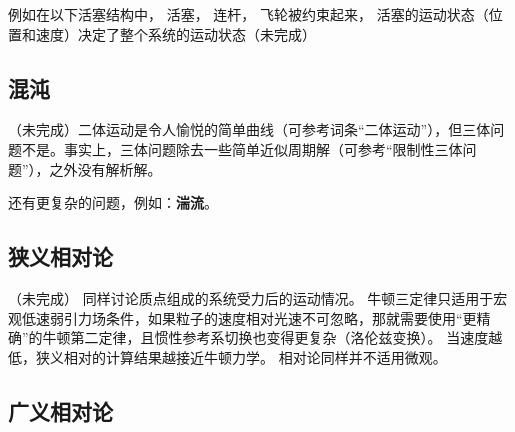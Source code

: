 例如在以下活塞结构中， 活塞， 连杆， 飞轮被约束起来， 活塞的运动状态（位置和速度）决定了整个系统的运动状态（未完成）%

\subsection{混沌}
（未完成）二体运动是令人愉悦的简单曲线（可参考词条“二体运动”），但三体问题不是。事实上，三体问题除去一些简单近似周期解（可参考“限制性三体问题”），之外没有解析解。

还有更复杂的问题，例如：\textbf{湍流}。

\subsection{狭义相对论}
（未完成）
同样讨论质点组成的系统受力后的运动情况。 牛顿三定律只适用于宏观低速弱引力场条件，如果粒子的速度相对光速不可忽略，那就需要使用“更精确”的牛顿第二定律，且惯性参考系切换也变得更复杂（洛伦兹变换）。 当速度越低，狭义相对的计算结果越接近牛顿力学。 相对论同样并不适用微观。

\subsection{广义相对论}

